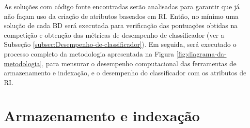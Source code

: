     

    As soluções com código fonte encontradas serão analisadas para garantir que já não façam uso da criação de atributos baseados em RI.
    Então, no mínimo uma solução de cada BD será executada para verificação das pontuações obtidas na competição e obtenção das métricas de desempenho de classificador (ver a Subseção \ref{subsec:Desempenho-de-classificador}).
    Em seguida, será executado o processo completo da metodologia apresentada na Figura \ref{fig:diagrama-da-metodologia}, para mensurar o desempenho computacional das ferramentas de armazenamento e indexação, e o desempenho do classificador com os atributos de RI.
    
    
\section{Armazenamento e indexação} \label{sec:Armazenamento-e-indexação}

